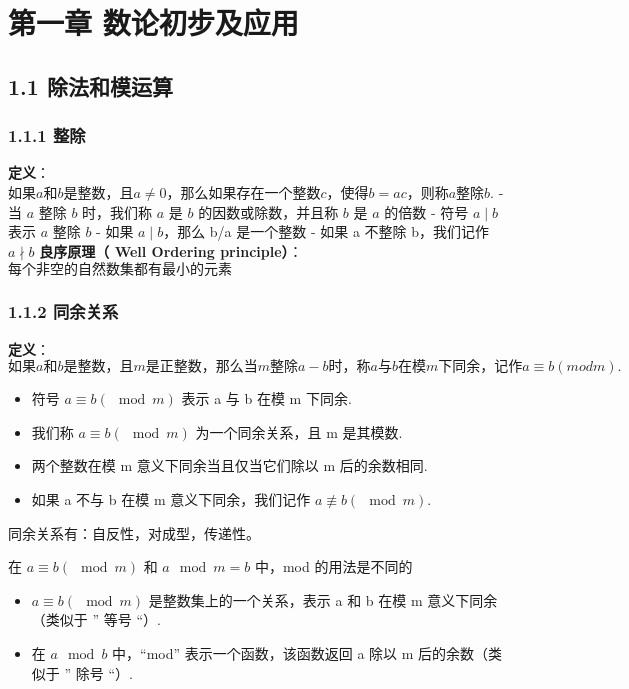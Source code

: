 \section{第一章
数论初步及应用}\label{ux7b2cux4e00ux7ae0-ux6570ux8bbaux521dux6b65ux53caux5e94ux7528}

\subsection{1.1
除法和模运算}\label{ux9664ux6cd5ux548cux6a21ux8fd0ux7b97}

\subsubsection{1.1.1 整除}\label{ux6574ux9664}

\textbf{定义}：\(如果 a 和 b 是整数，且 a≠0，那么如果存在一个整数 c，使得 b=ac，则称 a 整除 b.\)
- 当 \(a\) 整除 \(b\) 时，我们称 \(a\) 是 \(b\) 的因数或除数，并且称
\(b\) 是 \(a\) 的倍数 - 符号 \(a \mid  b\) 表示 \(a\) 整除 \(b\) - 如果
\(a \mid b\)，那么 b/a 是一个整数 - 如果 a 不整除 b，我们记作
\(a\nmid b\) \textbf{良序原理（ Well Ordering
principle）}：\(每个非空的自然数集都有最小的元素\)

\subsubsection{1.1.2 同余关系}\label{ux540cux4f59ux5173ux7cfb}

\textbf{定义}：\(如果 a 和 b 是整数，且 m 是正整数，那么当 m 整除 a−b 时，称 a 与 b 在模 m 下同余，记作 a \equiv b (mod m).\)

\begin{itemize}
\tightlist
\item
  符号 \(a \equiv b (\mod m)\) 表示 a 与 b 在模 m 下同余.
\item
  我们称 \(a \equiv b (\mod m)\) 为一个同余关系，且 m 是其模数.
\item
  两个整数在模 m 意义下同余当且仅当它们除以 m 后的余数相同.
\item
  如果 a 不与 b 在模 m 意义下同余，我们记作 \(a \not\equiv b(\mod m)\).
\end{itemize}

同余关系有：自反性，对成型，传递性。

在 \(a\equiv b (\mod m)\) 和 \(a\mod m=b\) 中，mod 的用法是不同的

\begin{itemize}
\tightlist
\item
  \(a\equiv b (\mod m)\) 是整数集上的一个关系，表示 a 和 b 在模 m
  意义下同余（类似于 '' 等号 ``）.
\item
  在 \(a\mod b\) 中，``mod'' 表示一个函数，该函数返回 a 除以 m
  后的余数（类似于 '' 除号 ``）.
\end{itemize}


